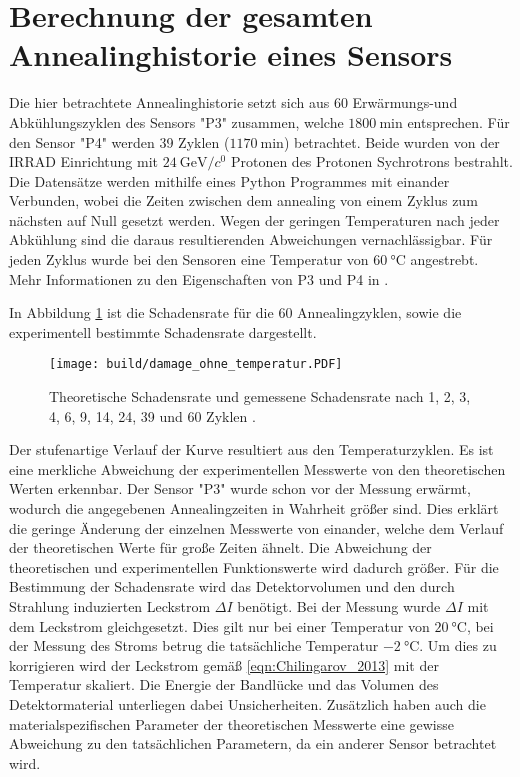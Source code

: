 \section{Berechnung der gesamten Annealinghistorie eines Sensors}
Die hier betrachtete Annealinghistorie setzt sich aus 60 Erwärmungs-und
Abkühlungszyklen des Sensors "P3" zusammen, welche $\SI{1800}{\minute}$ entsprechen.
Für den Sensor "P4" werden 39 Zyklen ($\SI{1170}{\minute}$) betrachtet.
Beide wurden von der ${\mathrm{IRRAD}}$ Einrichtung mit $\SI{24}{\giga\eV\per\clight}$ Protonen des Protonen Sychrotrons bestrahlt.
Die Datensätze werden mithilfe eines Python Programmes mit einander Verbunden,
wobei die Zeiten zwischen dem annealing von einem Zyklus zum nächsten auf Null gesetzt werden. Wegen der geringen
Temperaturen nach jeder Abkühlung sind die daraus resultierenden Abweichungen vernachlässigbar.
Für jeden Zyklus wurde bei den Sensoren eine Temperatur von $\SI{60}{\celsius}$ angestrebt.
Mehr Informationen zu den Eigenschaften von P3 und P4 in  \cite{felix}.


In Abbildung \ref{fig:P_3} ist die Schadensrate für die 60 Annealingzyklen,
sowie die experimentell bestimmte Schadensrate dargestellt.

\begin{figure}
    \texttt{[image: build/damage\_ohne\_temperatur.PDF]}
\caption{Theoretische Schadensrate und gemessene Schadensrate nach 1, 2, 3, 4, 6, 9, 14, 24, 39 und 60 Zyklen .}
\label{fig:P_3}
\end{figure}

Der stufenartige Verlauf der Kurve resultiert aus den Temperaturzyklen.
Es ist eine merkliche Abweichung der experimentellen Messwerte von den theoretischen
Werten erkennbar. Der Sensor "P3" wurde schon vor der Messung erwärmt, wodurch
die angegebenen Annealingzeiten in Wahrheit größer sind. Dies erklärt die
geringe Änderung der einzelnen Messwerte von einander, welche dem
Verlauf der theoretischen Werte für große Zeiten ähnelt. Die Abweichung der theoretischen
und experimentellen Funktionswerte wird dadurch größer.
Für die Bestimmung der Schadensrate wird das Detektorvolumen und den durch
Strahlung induzierten Leckstrom $\Delta I$ benötigt. Bei der Messung wurde
$\Delta I$ mit dem Leckstrom gleichgesetzt. Dies gilt nur bei einer Temperatur
von $\SI{20}{\celsius}$, bei der Messung des Stroms betrug die tatsächliche Temperatur
$\SI{-2}{\celsius}$. Um dies zu korrigieren wird der Leckstrom gemäß \ref{eqn:Chilingarov_2013}
mit der Temperatur skaliert. Die Energie der Bandlücke und das Volumen des Detektormaterial
unterliegen dabei Unsicherheiten. Zusätzlich haben auch die materialspezifischen Parameter
der theoretischen Messwerte eine gewisse Abweichung zu den tatsächlichen Parametern, da
ein anderer Sensor betrachtet wird.

